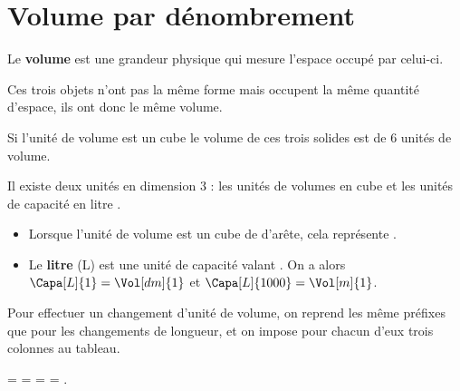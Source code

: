 \section{Volume par dénombrement}
\begin{definition}
   Le \textbf{volume} est une grandeur physique qui mesure l'espace occupé par celui-ci.
\end{definition}

\begin{exemple*1}
   Ces trois objets n'ont pas la même forme mais occupent la même quantité d'espace, ils ont donc le même volume.
   \begin{center}
    \hfill
    \hfill
    \hfill
    \hfill\phantom{r}
   \end{center}
   Si l'unité de volume est un cube 
   \hfill le volume de ces trois solides est de 6 unités de volume.
\end{exemple*1}

Il existe deux unités en dimension 3 : les unités de volumes en \og cube \fg{} et les unités de capacité en \og litre \fg. 

\begin{definition}
   \begin{itemize}
      \item Lorsque l'unité de volume est un cube de  d'arête, cela représente .
      \item Le {\bf litre} (L) est une unité de capacité valant . On a alors $\Capa[L]{1} =\Vol[dm]{1}$ et $\Capa[L]{1000} =\Vol[m]{1}$.
   \end{itemize}
   \vspace*{-4mm}
\end{definition}

Pour effectuer un changement d'unité de volume, on reprend les même préfixes que pour les changements de longueur, et on impose pour chacun d'eux trois colonnes au tableau.

\vspace*{-8mm}

\begin{exemple*1}
     =  =  =  = .
\end{exemple*1}